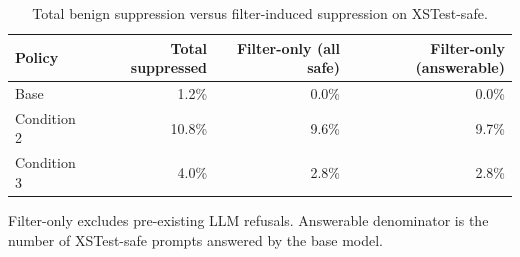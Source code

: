 \begin{table}[t]
\centering
\small
\caption{Total benign suppression versus filter-induced suppression on XSTest-safe.}
\label{tab:jev_legitimate_suppression}
\begin{tabular}{lrrr}
\toprule
Policy & Total suppressed & Filter-only (all safe) & Filter-only (answerable) \\
\midrule
Base & 1.2\% & 0.0\% & 0.0\% \\
Condition 2 & 10.8\% & 9.6\% & 9.7\% \\
Condition 3 & 4.0\% & 2.8\% & 2.8\% \\
\bottomrule
\end{tabular}
\par\vspace{2pt}
\begin{minipage}{\linewidth}
\footnotesize Filter-only excludes pre-existing LLM refusals. Answerable denominator is the number of XSTest-safe prompts answered by the base model.
\end{minipage}
\end{table}
